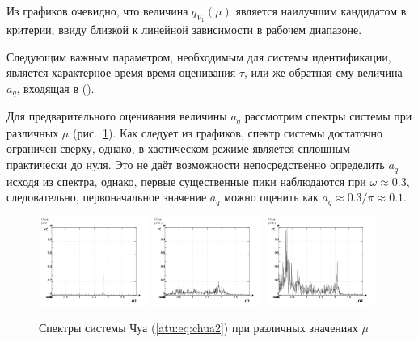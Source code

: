 \documentclass[a4paper,12pt]{article}
\begin{document}
Из графиков очевидно, что величина $ q_{V_1}(\mu) $
является наилучшим кандидатом в критерии, ввиду близкой к линейной зависимости
в рабочем диапазоне.

Следующим важным параметром, необходимым для системы идентификации, является
характерное время время оценивания $\tau$, или же обратная ему величина $a_q$,
входящая в (). %

Для предварительного оценивания величины $a_q$ рассмотрим спектры системы при различных
$\mu$ (рис.~\ref{atu:f:chua_spectrum}). Как следует из графиков, спектр системы достаточно
ограничен сверху, однако, в хаотическом режиме является сплошным практически до нуля.
Это не даёт возможности непосредственно определить $a_q$ исходя из спектра,
однако, первые существенные пики наблюдаются при $ \omega \approx 0.3 $, следовательно,
первоначальное значение $a_q$ можно оценить как $ a_q \approx 0.3 / \pi \approx 0.1 $.


\begin{figure}[htb!]
\centerline{
  \includegraphics[width=0.32\textwidth]{p/cha/chua/chua_f-p_f_mu=2x00.png}
  \includegraphics[width=0.32\textwidth]{p/cha/chua/chua_f-p_f_mu=2x74.png}
  \includegraphics[width=0.32\textwidth]{p/cha/chua/chua_f-p_f_mu=4x50.png}
}
\caption{Спектры системы Чуа (\ref{atu:eq:chua2}) при различных значениях $\mu$}
\label{atu:f:chua_spectrum}
\end{figure}
\end{document}
